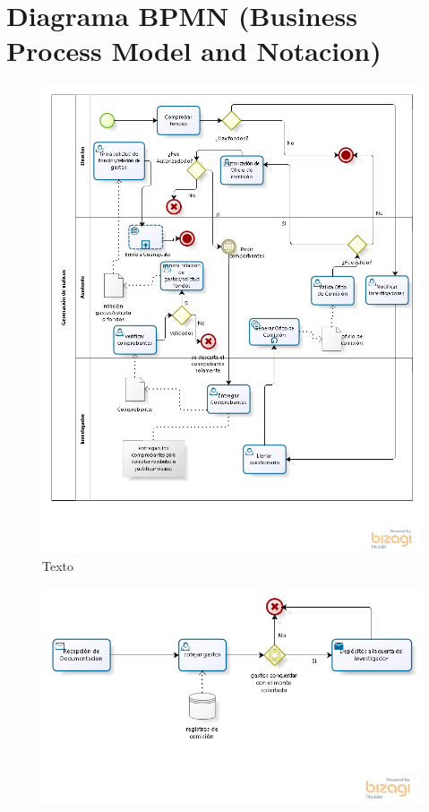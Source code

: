 \documentclass{report}
\begin{document}
    \section{Diagrama BPMN (Business Process Model and Notacion)}
    
    	\begin{figure}[H]
    		\centering
    			\includegraphics[scale=0.80]{images/1models/comision.png}  
    			\caption{Texto}  		
    	\end{figure}
    	
    	\begin{figure}[H]
    		\centering
    			\includegraphics[scale=0.80]{images/1models/envioGto.png}
    	
    	\end{figure}
    
\end{document}
